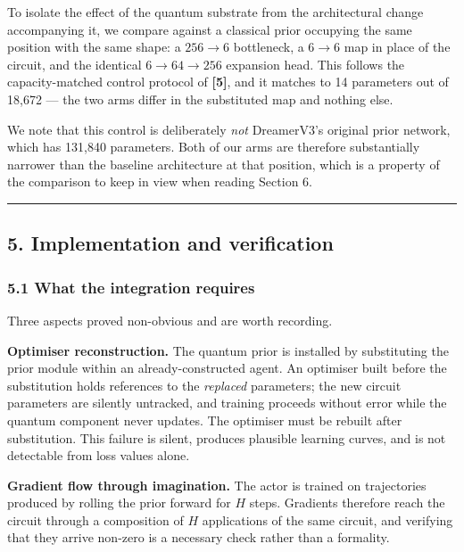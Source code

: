 \documentclass[
  11pt]{article}
\begin{document}
To isolate the effect of the quantum substrate from the architectural
change accompanying it, we compare against a classical prior occupying
the same position with the same shape: a \(256 \rightarrow 6\)
bottleneck, a \(6 \rightarrow 6\) map in place of the circuit, and the
identical \(6 \rightarrow 64 \rightarrow 256\) expansion head. This
follows the capacity-matched control protocol of \textbf{{[}5{]}}, and
it matches to 14 parameters out of 18,672 --- the two arms differ in the
substituted map and nothing else.

We note that this control is deliberately \emph{not} DreamerV3's
original prior network, which has 131,840 parameters. Both of our arms
are therefore substantially narrower than the baseline architecture at
that position, which is a property of the comparison to keep in view
when reading Section 6.

\begin{center}\rule{0.5\linewidth}{0.5pt}\end{center}

\hypertarget{implementation-and-verification}{%
\subsection{5. Implementation and
verification}\label{implementation-and-verification}}

\hypertarget{what-the-integration-requires}{%
\subsubsection{5.1 What the integration
requires}\label{what-the-integration-requires}}

Three aspects proved non-obvious and are worth recording.

\textbf{Optimiser reconstruction.} The quantum prior is installed by
substituting the prior module within an already-constructed agent. An
optimiser built before the substitution holds references to the
\emph{replaced} parameters; the new circuit parameters are silently
untracked, and training proceeds without error while the quantum
component never updates. The optimiser must be rebuilt after
substitution. This failure is silent, produces plausible learning
curves, and is not detectable from loss values alone.

\textbf{Gradient flow through imagination.} The actor is trained on
trajectories produced by rolling the prior forward for \(H\) steps.
Gradients therefore reach the circuit through a composition of \(H\)
applications of the same circuit, and verifying that they arrive
non-zero is a necessary check rather than a formality.
\end{document}
